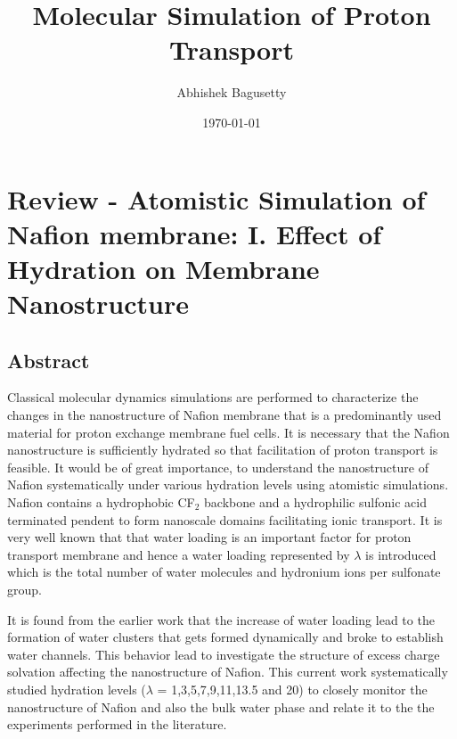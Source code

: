 \documentclass{article}
\author{Abhishek Bagusetty}
\date{\today}
\title{Molecular Simulation of Proton Transport}
\begin{document}
\maketitle

\section{Review - Atomistic Simulation of Nafion membrane: I. Effect of Hydration on Membrane Nanostructure \cite{devnathan2007}}
\label{sec-1}
\subsection{Abstract}
\label{sec-1-1}
Classical molecular dynamics simulations are performed to characterize the changes in the nanostructure of Nafion membrane that is a predominantly used material for proton exchange membrane fuel cells. It is necessary that the Nafion nanostructure is sufficiently hydrated so that facilitation of proton transport is feasible. It would be of great importance, to understand the nanostructure of Nafion systematically under various hydration levels using atomistic simulations. Nafion contains a hydrophobic CF$_{\text{2}}$ backbone and a hydrophilic sulfonic acid terminated pendent to form nanoscale domains facilitating ionic transport. It is very well known that that water loading is an important factor for proton transport membrane and hence a water loading represented by $\lambda$ is introduced which is the total number of water molecules and hydronium ions per sulfonate group.

It is found from the earlier work that the increase of water loading lead to the formation of water clusters that gets formed dynamically and broke to establish water channels. This behavior lead to investigate the structure of excess charge solvation affecting the nanostructure of Nafion. This current work systematically studied hydration levels ($\lambda$ = 1,3,5,7,9,11,13.5 and 20) to closely monitor the nanostructure of Nafion and also the bulk water phase and relate it to the the experiments performed in the literature.
\end{document}
